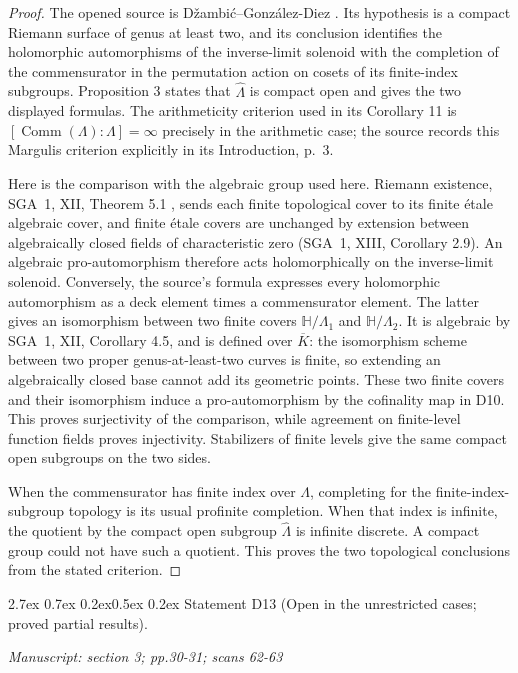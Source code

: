 \documentclass[11pt,a4paper]{article}
\makeatletter
\newcommand{\passage}[1]{\par\smallskip\noindent\textit{Manuscript: #1}\par\smallskip}
\renewcommand\paragraph{\@startsection{paragraph}{4}{\z@}%
  {2.7ex \@plus 0.7ex \@minus 0.2ex}{0.5ex \@plus 0.2ex}%
  {\normalfont\normalsize\bfseries}}
\makeatother
\begin{document}
\begin{proof}
The opened source is D\v zambi\'c--Gonz\'alez-Diez
\cite[Theorem 7 and Proposition 3]{D_DzambicGonzalezDiez}.
Its hypothesis is a compact Riemann surface of genus at least two,
and its conclusion identifies the holomorphic automorphisms of the
inverse-limit solenoid with the completion of the commensurator in
the permutation action on cosets of its finite-index subgroups.
Proposition 3 states that $\widehat\Lambda$ is compact open and gives
the two displayed formulas.  The arithmeticity criterion used in its
Corollary 11 is
$[\operatorname{Comm}(\Lambda):\Lambda]=\infty$ precisely in the
arithmetic case; the source records this Margulis criterion explicitly
in its Introduction, p.~3.

Here is the comparison with the algebraic group used here.  Riemann
existence, SGA~1, XII, Theorem 5.1 \cite{D_SGA1}, sends each finite
topological cover to its finite \'etale algebraic cover, and finite
\'etale covers are unchanged by extension between algebraically closed
fields of characteristic zero (SGA~1, XIII, Corollary 2.9).
An algebraic pro-automorphism therefore acts holomorphically on the
inverse-limit solenoid.  Conversely, the source's formula expresses
every holomorphic automorphism as a deck element times a commensurator
element.  The latter gives an isomorphism between two finite covers
$\mathbb H/\Lambda_1$ and $\mathbb H/\Lambda_2$.  It is algebraic by
SGA~1, XII, Corollary 4.5, and
is defined over $\overline K$: the isomorphism scheme between two
proper genus-at-least-two curves is finite, so extending an algebraically
closed base cannot add its geometric points.  These two finite covers
and their isomorphism induce a pro-automorphism by the cofinality map
in D10.  This proves surjectivity of the comparison, while agreement
on finite-level function fields proves injectivity.  Stabilizers of
finite levels give the same compact open subgroups on the two sides.

When the commensurator has finite index over $\Lambda$, completing for
the finite-index-subgroup topology is its usual profinite completion.
When that index is infinite, the quotient by the compact open subgroup
$\widehat\Lambda$ is infinite discrete.  A compact group could not have
such a quotient.  This proves the two topological conclusions from
the stated criterion.
\end{proof}

\paragraph{Statement D13 (Open in the unrestricted cases; proved partial results).}
\label{res:D13}
\passage{section 3; pp.30-31; scans 62-63}
\end{document}
